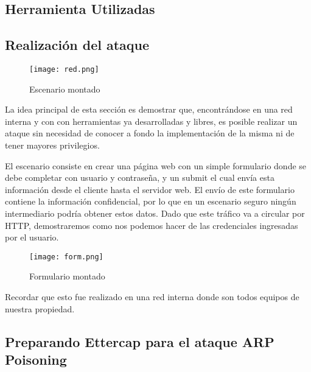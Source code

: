 
\subsection{Herramienta Utilizadas} 
    


\subsection{Realización del ataque}

\begin{center}
    \begin{figure}   
       \begin{center}
          \texttt{[image: red.png]}
       \end{center}
       \caption{Escenario montado}
    \end{figure}
 \end{center}

La idea principal de esta sección es demostrar que, encontrándose en una red interna
y con con herramientas ya desarrolladas y libres, es posible realizar un ataque 
sin necesidad de conocer a fondo la implementación de la misma ni de tener mayores
privilegios.

El escenario consiste en crear una página web con un 
simple formulario donde se debe completar con usuario y contraseña, y un 
submit el cual envía esta información desde el cliente hasta el 
servidor web. El envío de este formulario contiene la información confidencial,
 por lo que en un escenario seguro ningún
intermediario podría obtener estos datos. Dado que este tráfico va a 
circular por HTTP, demostraremos como nos podemos hacer de las credenciales
ingresadas por el usuario.

\begin{center}
   \begin{figure}   
      \begin{center}
         \texttt{[image: form.png]}
      \end{center}
      \caption{Formulario montado}
   \end{figure}
\end{center}

Recordar que esto fue realizado en una red interna donde son todos equipos de nuestra propiedad.


\subsection{Preparando Ettercap para el ataque ARP Poisoning}

